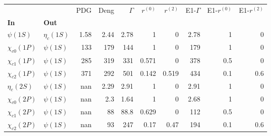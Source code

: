 \begin{tabular}{l|l|r|r|r|r|r|r|r|r}
\toprule
                &            &  PDG &  Deng &  $\Gamma$ &  $r^{(0)}$ &  $r^{(2)}$ &  E1-$\Gamma$ &  E1-$r^{(0)}$ &  E1-$r^{(2)}$ \\
\textbf{In} & \textbf{Out} &      &       &           &            &            &              &               &               \\
\midrule
\textbf{$\psi(1S)$} & \textbf{$\eta_{c}(1S)$} & 1.58 &  2.44 &      2.78 &          1 &          0 &         2.78 &             1 &             0 \\
\textbf{$\chi_{c0}(1P)$} & \textbf{$\psi(1S)$} &  133 &   179 &       144 &          1 &          0 &          179 &             1 &             0 \\
\textbf{$\chi_{c1}(1P)$} & \textbf{$\psi(1S)$} &  285 &   319 &       331 &      0.571 &          0 &          378 &           0.5 &             0 \\
\textbf{$\chi_{c2}(1P)$} & \textbf{$\psi(1S)$} &  371 &   292 &       501 &      0.142 &      0.519 &          434 &           0.1 &           0.6 \\
\textbf{$\eta_{c}(2S)$} & \textbf{$\psi(1S)$} &  nan &  2.29 &      2.91 &          1 &          0 &         2.91 &             1 &             0 \\
\textbf{$\chi_{c0}(2P)$} & \textbf{$\psi(1S)$} &  nan &   2.3 &      1.64 &          1 &          0 &         2.68 &             1 &             0 \\
\textbf{$\chi_{c1}(2P)$} & \textbf{$\psi(1S)$} &  nan &    88 &      88.8 &      0.629 &          0 &          112 &           0.5 &             0 \\
\textbf{$\chi_{c2}(2P)$} & \textbf{$\psi(1S)$} &  nan &    93 &       247 &       0.17 &       0.47 &          194 &           0.1 &           0.6 \\
\bottomrule
\end{tabular}
